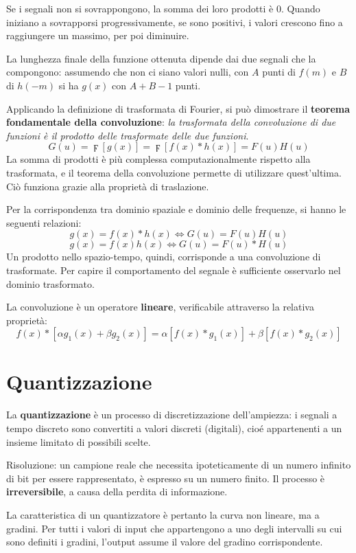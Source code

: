 Se i segnali non si sovrappongono, la somma dei loro prodotti è 0. Quando iniziano a sovrapporsi progressivamente, se sono positivi, i valori crescono fino a raggiungere un massimo, per poi diminuire.

La lunghezza finale della funzione ottenuta dipende dai due segnali che la compongono: assumendo che non ci siano valori nulli, con $A$ punti di $f(m)$ e $B$ di $h(-m)$ si ha $g(x)$ con $A + B - 1$ punti.

Applicando la definizione di trasformata di Fourier, si può dimostrare il \textbf{teorema fondamentale della convoluzione}: \textit{la trasformata della convoluzione di due funzioni è il prodotto delle trasformate delle due funzioni}.
$$G(u) = \digamma[g(x)] = \digamma[f(x) * h(x)] = F(u)H(u)$$
La somma di prodotti è più complessa computazionalmente rispetto alla trasformata, e il teorema della convoluzione permette di utilizzare quest'ultima. Ciò funziona grazie alla proprietà di traslazione. 

Per la corrispondenza tra dominio spaziale e dominio delle frequenze, si hanno le seguenti relazioni:
$$g(x) = f(x) * h(x) \Longleftrightarrow G(u) = F(u)H(u)$$
$$g(x) = f(x)h(x) \Longleftrightarrow G(u) = F(u) * H(u)$$
Un prodotto nello spazio-tempo, quindi, corrisponde a una convoluzione di trasformate. Per capire il comportamento del segnale è sufficiente osservarlo nel dominio trasformato.

La convoluzione è un operatore \textbf{lineare}, verificabile attraverso la relativa proprietà:
$$f(x) * [\alpha g_1(x) + \beta g_2(x)] = \alpha[f(x) * g_1(x)] + \beta[f(x) * g_2(x)]$$

\section{Quantizzazione}
La \textbf{quantizzazione} è un processo di discretizzazione dell'ampiezza: i segnali a tempo discreto sono convertiti a valori discreti (digitali), cioé appartenenti a un insieme limitato di possibili scelte.

Risoluzione: un campione reale che necessita ipoteticamente di un numero infinito di bit per essere rappresentato, è espresso su un numero finito. Il processo è \textbf{irreversibile}, a causa della perdita di informazione.

La caratteristica di un quantizzatore è pertanto la curva non lineare, ma a gradini. Per tutti i valori di input che appartengono a uno degli intervalli su cui sono definiti i gradini, l'output assume il valore del gradino corrispondente.

